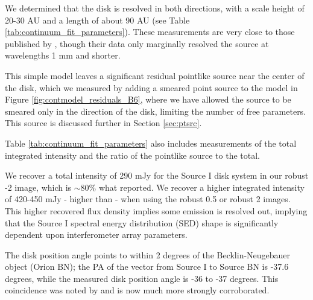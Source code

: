 \documentclass[twocolumn]{aastex61}
\begin{document}
We determined that the disk is resolved in both
directions, with a scale height of 20-30 AU and a length of about
90 AU (see Table \ref{tab:continuum_fit_parameters}).  These measurements
are very close to those published by \citet{Plambeck2016a}, though their data
only marginally resolved the source at wavelengths 1 mm and shorter.

This simple model leaves a significant residual pointlike source near
the center of the disk, which we measured by adding a smeared point
source to the model in Figure \ref{fig:contmodel_residuals_B6},
where we have allowed the source to be smeared only in the direction
of the disk, limiting the number of free parameters.
This source is discussed further in Section \ref{sec:ptsrc}.

Table \ref{tab:continuum_fit_parameters} also includes measurements
of the total integrated intensity and the ratio of the pointlike source to
the total.

We recover a total intensity of 290 mJy for the Source I disk
system in our robust -2 image, which is  $\sim80\%$ what
\citet{Plambeck2016a} reported.  We recover a higher integrated intensity of
420-450 mJy - higher than \citet{Plambeck2016a} - when using the robust 0.5 
or robust 2 images.  This higher recovered flux density implies some emission
is resolved out, implying that the Source I spectral energy distribution (SED)
shape is significantly dependent upon interferometer array parameters.



The disk position angle points to within 2 degrees of the Becklin-Neugebauer
object (Orion BN); the PA of the vector from Source I to Source BN is -37.6
degrees, while the measured disk position angle is -36 to -37 degrees.
This coincidence was noted by \citet{Bally2011a} and is now much more strongly
corroborated.

\end{document}

